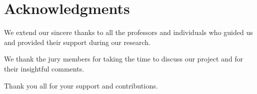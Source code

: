 %
\section*{Acknowledgments}
\label{sec::Acknowledgments}

We extend our sincere thanks to all the professors and individuals who guided us and provided their support during our research.


We thank the jury members for taking the time to discuss our project and for their insightful comments.



Thank you all for your support and contributions.




\vspace*{\fill}
